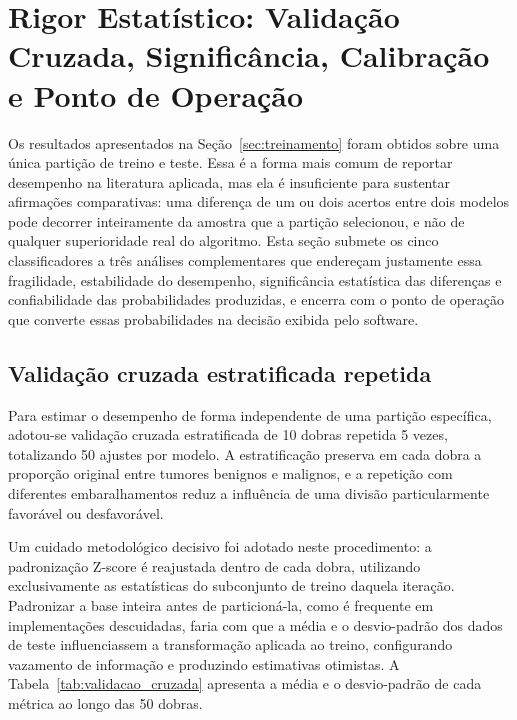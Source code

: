 \documentclass[
    12pt
    ,oneside
    ,a4paper
    ,chapter=TITLE
    ,section=TITLE
    ,sumario=abnt-6027-2012
    ,english,brazil]{abntex2} %
\begin{document}
\section{Rigor Estatístico: Validação Cruzada, Significância, Calibração e Ponto de Operação}
\label{sec:rigor-estatistico}

Os resultados apresentados na Seção~\ref{sec:treinamento} foram obtidos sobre
uma única partição de treino e teste. Essa é a forma mais comum de reportar
desempenho na literatura aplicada, mas ela é insuficiente para sustentar
afirmações comparativas: uma diferença de um ou dois acertos entre dois modelos
pode decorrer inteiramente da amostra que a partição selecionou, e não de
qualquer superioridade real do algoritmo. Esta seção submete os cinco
classificadores a três análises complementares que endereçam justamente essa
fragilidade, estabilidade do desempenho, significância estatística das
diferenças e confiabilidade das probabilidades produzidas, e encerra com o
ponto de operação que converte essas probabilidades na decisão exibida pelo
software.

\subsection{Validação cruzada estratificada repetida}
\label{subsec:validacao-cruzada}

Para estimar o desempenho de forma independente de uma partição específica,
adotou-se validação cruzada estratificada de 10 dobras repetida 5 vezes,
totalizando 50 ajustes por modelo. A estratificação preserva em cada dobra a
proporção original entre tumores benignos e malignos, e a repetição com
diferentes embaralhamentos reduz a influência de uma divisão particularmente
favorável ou desfavorável.

Um cuidado metodológico decisivo foi adotado neste procedimento: a padronização
Z-score é reajustada dentro de cada dobra, utilizando exclusivamente as
estatísticas do subconjunto de treino daquela iteração. Padronizar a base
inteira antes de particioná-la, como é frequente em implementações
descuidadas, faria com que a média e o desvio-padrão dos dados de teste
influenciassem a transformação aplicada ao treino, configurando vazamento de
informação e produzindo estimativas otimistas. A Tabela~\ref{tab:validacao_cruzada}
apresenta a média e o desvio-padrão de cada métrica ao longo das 50 dobras.
\end{document}
